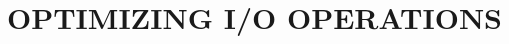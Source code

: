 \documentclass[a4paper,twoside]{article}
\begin{document}
%
%
%
%


\section{\uppercase{Optimizing I/O Operations}}
\label{sec:io}
\end{document}
